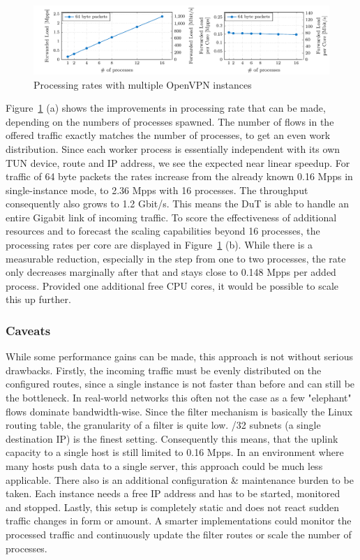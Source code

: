 \documentclass[IN,11pt,twoside,openright,master,english]{tumthesis}
\begin{document}
\begin{figure}[h]
	\centering
	\includegraphics[width=1\linewidth]{figures/openvpn_multi_process_60_bytes_variable_flows}
	\caption{Processing rates with multiple OpenVPN instances}
	\label{fig:openvpnmultiprocess60bytesvariableflows}
\end{figure}

Figure~\ref{fig:openvpnmultiprocess60bytesvariableflows} (a) shows the improvements in processing rate that can be made, depending on the numbers of processes spawned. The number of flows in the offered traffic exactly matches the number of processes, to get an even work distribution.
Since each worker process is essentially independent with its own TUN device, route and IP address, we see the expected near linear speedup. For traffic of 64 byte packets the rates increase from the already known 0.16 Mpps in single-instance mode, to 2.36 Mpps with 16 processes. The throughput consequently also grows to 1.2 Gbit/s. This means the DuT is able to handle an entire Gigabit link of incoming traffic.
To score the effectiveness of additional resources and to forecast the scaling capabilities beyond 16 processes, the processing rates per core are displayed in Figure~\ref{fig:openvpnmultiprocess60bytesvariableflows} (b). While there is a measurable reduction, especially in the step from one to two processes, the rate only decreases marginally after that and stays close to 0.148 Mpps per added process.
Provided one additional free CPU cores, it would be possible to scale this up further.

\subsubsection{Caveats}
While some performance gains can be made, this approach is not without serious drawbacks.
Firstly, the incoming traffic must be evenly distributed on the configured routes, since a single instance is not faster than before and can still be the bottleneck. In real-world networks this often not the case as a few "elephant" flows dominate bandwidth-wise.
Since the filter mechanism is basically the Linux routing table, the granularity of a filter is quite low. /32 subnets (a single destination IP) is the finest setting. 
Consequently this means, that the uplink capacity to a single host is still limited to 0.16 Mpps. In an environment where many hosts push data to a single server, this approach could be much less applicable.
There also is an additional configuration \& maintenance burden to be taken. Each instance needs a free IP address and has to be started, monitored and stopped.
Lastly, this setup is completely static and does not react sudden traffic changes in form or amount. A smarter implementations could monitor the processed traffic and continuously update the filter routes or scale the number of processes.
\end{document}
